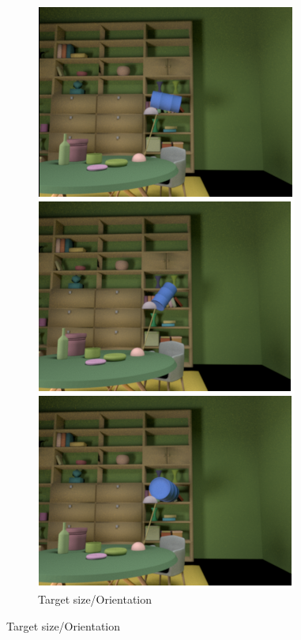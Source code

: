 \documentclass{jov}
\begin{document}
\begin{figure}
\begin{subfigure}[b]{0.18 \textwidth}
        \label{fig:targetPositionVariation}
    \end{subfigure}
    ~
	\begin{subfigure}[b]{0.18 \textwidth}
    \centering
        \caption{Target size/Orientation}
        \includegraphics[width=\textwidth]{../FiguresDraft4/Figure5/Figure5_e.png}

\end{subfigure}
\end{figure}
\end{document}
